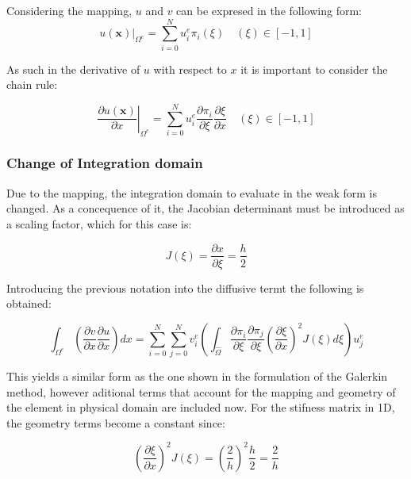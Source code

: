 \documentclass[
  a4paper,
  10pt]{article}
\begin{document}
Considering the mapping, \(u\) and \(v\) can be expresed in the
following form: \begin{equation}
\left.u(\textbf{x})\right\rvert_{\Omega^{e}}=\sum_{i=0}^{N}u_{i}^{e} \pi_{i}(\xi)  \quad (\xi) \in [-1,1]
\end{equation}

As such in the derivative of \(u\) with respect to \(x\) it is important
to consider the chain rule:

\begin{equation}
\left. \frac{\partial u(\textbf{x})}{\partial x}\right\rvert_{\Omega^{e}}=\sum_{i=0}^{N} u_{i}^{e} \frac{\partial \pi_{i}}{\partial\xi}\frac{\partial\xi}{\partial x}  \quad (\xi) \in [-1,1]
\end{equation}

\hypertarget{change-of-integration-domain}{%
\subsubsection{Change of Integration
domain}\label{change-of-integration-domain}}

Due to the mapping, the integration domain to evaluate in the weak form
is changed. As a concequence of it, the Jacobian determinant must be
introduced as a scaling factor, which for this case is:

\begin{equation}
J(\xi)=\frac{\partial x}{\partial \xi}=\frac{h}{2}
\end{equation}

Introducing the previous notation into the diffusive termt the following
is obtained:

\begin{equation}
\int_{\Omega^{e}} ( \frac{\partial v}{\partial x}\frac{\partial u}{\partial x})dx = \sum_{i=0}^{N}\sum_{j=0}^{N} v_i^{e}( \int_{\hat{\Omega}}\frac{\partial \pi_{i}}{\partial\xi}\frac{\partial \pi_{j}}{\partial\xi}(\frac{\partial\xi}{\partial x})^{2} J(\xi) d\xi)u_j^{e}
\end{equation}

This yields a similar form as the one shown in the formulation of the
Galerkin method, however aditional terms that account for the mapping
and geometry of the element in physical domain are included now. For the
stifness matrix in 1D, the geometry terms become a constant since:

\begin{equation}
(\frac{\partial \xi}{\partial x})^{2} J(\xi)= (\frac{2}{h})^{2}\frac{h}{2}=\frac{2}{h} 
\end{equation}
\end{document}
